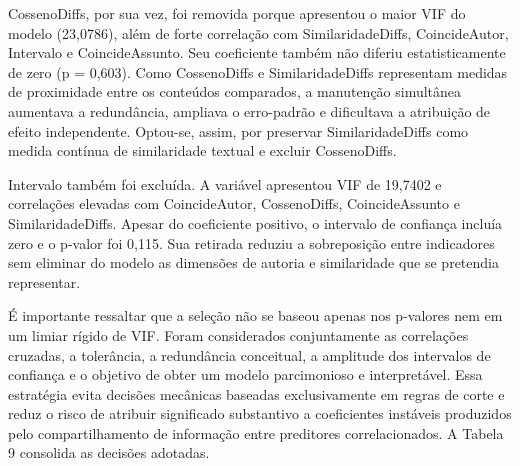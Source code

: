 CossenoDiffs, por sua vez, foi removida porque apresentou o maior VIF do
modelo (23,0786), além de forte correlação com SimilaridadeDiffs,
CoincideAutor, Intervalo e CoincideAssunto. Seu coeficiente também não
diferiu estatisticamente de zero (p = 0,603). Como CossenoDiffs e
SimilaridadeDiffs representam medidas de proximidade entre os conteúdos
comparados, a manutenção simultânea aumentava a redundância, ampliava o
erro-padrão e dificultava a atribuição de efeito independente. Optou-se,
assim, por preservar SimilaridadeDiffs como medida contínua de
similaridade textual e excluir CossenoDiffs.

Intervalo também foi excluída. A variável apresentou VIF de 19,7402 e
correlações elevadas com CoincideAutor, CossenoDiffs, CoincideAssunto e
SimilaridadeDiffs. Apesar do coeficiente positivo, o intervalo de
confiança incluía zero e o p-valor foi 0,115. Sua retirada reduziu a
sobreposição entre indicadores sem eliminar do modelo as dimensões de
autoria e similaridade que se pretendia representar.

É importante ressaltar que a seleção não se baseou apenas nos p-valores
nem em um limiar rígido de VIF. Foram considerados conjuntamente as
correlações cruzadas, a tolerância, a redundância conceitual, a
amplitude dos intervalos de confiança e o objetivo de obter um modelo
parcimonioso e interpretável. Essa estratégia evita decisões mecânicas
baseadas exclusivamente em regras de corte e reduz o risco de atribuir
significado substantivo a coeficientes instáveis produzidos pelo
compartilhamento de informação entre preditores correlacionados. A
Tabela 9 consolida as decisões adotadas.

